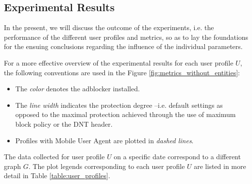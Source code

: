 \documentclass{sig-alternate}
\begin{document}
\subsection{Experimental Results}
In the present, we will discuss the outcome of the experiments, i.e. the performance of the different user profiles and metrics, so as to lay the foundations for the ensuing conclusions regarding the influence of the individual parameters.

For a more effective overview of the experimental results for each user profile $U$, the following conventions are used in the Figure \ref{fig:metrics_without_entities}:
\begin{itemize}
 \item The \textit{color} denotes the adblocker installed.
 \item The \textit{line width} indicates the protection degree --i.e. default settings as opposed to the maximal protection achieved through the use of maximum block policy or the DNT header.
 \item Profiles with Mobile User Agent are plotted in \textit{dashed lines}.
\end{itemize}
The data collected for user profile $U$ on a specific date correspond to a different graph $G$. The plot legends corresponding to each user profile $U$ are listed in more detail in Table \ref{table:user_profiles}.

  \newcommand\solidthinrule[1][.5cm]{\rule[0.5ex]{#1}{.4pt}}
  \newcommand\solidthickrule[1][.5cm]{\rule[0.5ex]{#1}{1.5pt}}
  \newcommand\dashedthinrule{\mbox{%
    \solidthinrule[1mm]\hspace{1mm}\solidthinrule[1mm]\hspace{1mm}\solidthinrule[1mm]}}
  \newcommand\dashedthickrule{\mbox{%
    \solidthickrule[1mm]\hspace{1mm}\solidthickrule[1mm]\hspace{1mm}\solidthickrule[1mm]}}
\end{document}
